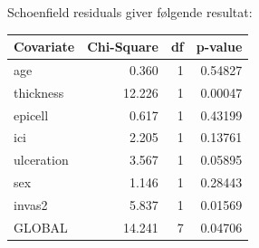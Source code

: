 \noindent Schoenfield residuals giver følgende resultat:
\begin{table}[h!]
\centering
\begin{tabular}{lrrr}
\hline
Covariate & Chi-Square & df & p-value \\
\hline
age        & 0.360     & 1  & 0.54827 \\
thickness  & 12.226    & 1  & 0.00047 \\
epicell    & 0.617     & 1  & 0.43199 \\
ici        & 2.205     & 1  & 0.13761 \\
ulceration & 3.567     & 1  & 0.05895 \\
sex        & 1.146     & 1  & 0.28443 \\
invas2     & 5.837     & 1  & 0.01569 \\
\hline
GLOBAL     & 14.241    & 7  & 0.04706 \\
\hline
\end{tabular}
\end{table}

